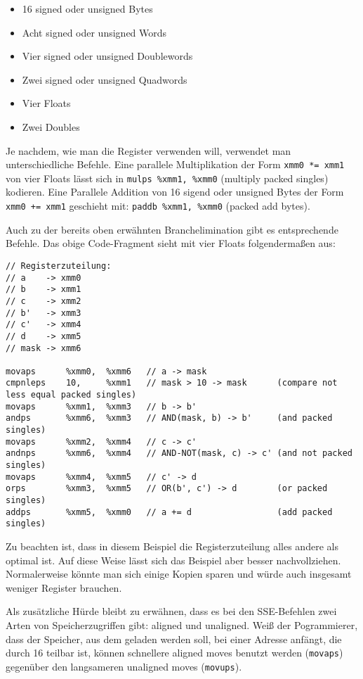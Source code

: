 \documentclass[a4paper,10pt]{article}
\begin{document}
\begin{itemize}
    \item 16 signed oder unsigned Bytes
    \item Acht signed oder unsigned Words
    \item Vier signed oder unsigned Doublewords
    \item Zwei signed oder unsigned Quadwords
    \item Vier Floats
    \item Zwei Doubles
\end{itemize}

Je nachdem, wie man die Register verwenden will, verwendet man unterschiedliche Befehle. Eine
parallele Multiplikation der Form \texttt{xmm0 *= xmm1} von vier Floats lässt sich in \texttt{mulps
\%xmm1, \%xmm0} (multiply packed singles) kodieren. Eine Parallele Addition von 16 sigend oder
unsigned Bytes der Form \texttt{xmm0 += xmm1} geschieht mit: \texttt{paddb \%xmm1, \%xmm0} (packed
add bytes). 

Auch zu der bereits oben erwähnten Branchelimination gibt es entsprechende Befehle. Das obige
Code-Fragment sieht mit vier Floats folgendermaßen aus:

\begin{verbatim}
// Registerzuteilung:
// a    -> xmm0
// b    -> xmm1
// c    -> xmm2
// b'   -> xmm3
// c'   -> xmm4
// d    -> xmm5
// mask -> xmm6

movaps      %xmm0,  %xmm6   // a -> mask
cmpnleps    10,     %xmm1   // mask > 10 -> mask      (compare not less equal packed singles)
movaps      %xmm1,  %xmm3   // b -> b'
andps       %xmm6,  %xmm3   // AND(mask, b) -> b'     (and packed singles) 
movaps      %xmm2,  %xmm4   // c -> c'
andnps      %xmm6,  %xmm4   // AND-NOT(mask, c) -> c' (and not packed singles)
movaps      %xmm4,  %xmm5   // c' -> d
orps        %xmm3,  %xmm5   // OR(b', c') -> d        (or packed singles)
addps       %xmm5,  %xmm0   // a += d                 (add packed singles)
\end{verbatim}

Zu beachten ist, dass in diesem Beispiel die Registerzuteilung alles andere als optimal ist. Auf
diese Weise lässt sich das Beispiel aber besser nachvollziehen. Normalerweise könnte man sich einige
Kopien sparen und würde auch insgesamt weniger Register brauchen.

Als zusätzliche Hürde bleibt zu erwähnen, dass es bei den SSE-Befehlen zwei Arten von
Speicherzugriffen gibt: aligned und unaligned. Weiß der Pogrammierer, dass der Speicher, aus dem
geladen werden soll, bei einer Adresse anfängt, die durch 16 teilbar ist, können schnellere aligned
moves benutzt werden (\texttt{movaps}) gegenüber den langsameren unaligned moves (\texttt{movups}).
\end{document}
